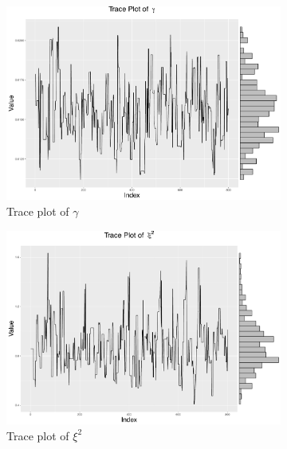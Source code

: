 \begin{figure}[h]
\centering
\begin{subfigure}[t]{0.45\textwidth}
	\includegraphics[width=\textwidth]{Chapters/05MCMCOU/plots/realdatalearninggam.pdf}
    \caption{Trace plot of $\gamma$}
\end{subfigure}
\begin{subfigure}[t]{0.45\textwidth}
	\includegraphics[width=\linewidth]{Chapters/05MCMCOU/plots/realdatalearningxi2.pdf}
 	\caption{Trace plot of $\xi^2$}
\end{subfigure}
\begin{subfigure}[t]{0.45\textwidth}

\end{subfigure}
\end{figure}
